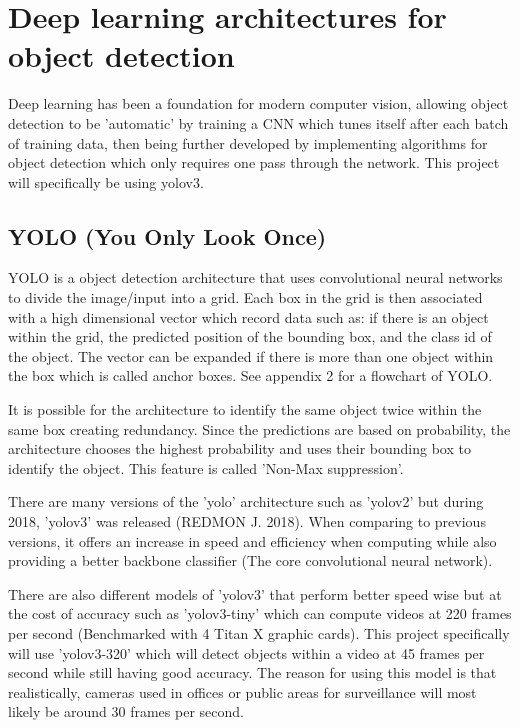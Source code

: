 \documentclass[12pt]{report}
\begin{document}
\section{Deep learning architectures for object detection}

Deep learning has been a foundation for modern computer vision, allowing object detection to be 'automatic' by training a CNN which tunes itself after each batch of training data, then being further developed by implementing algorithms for object detection which only requires one pass through the network. This project will specifically be using yolov3.

\subsection{YOLO (You Only Look Once)}

YOLO is a object detection architecture that uses convolutional neural networks to divide the image/input into a grid. Each box in the grid is then associated with a high dimensional vector which record data such as: if there is an object within the grid, the predicted position of the bounding box, and the class id of the object. The vector can be expanded if there is more than one object within the box which is called anchor boxes. See appendix 2 for a flowchart of YOLO.

\vspace{2mm}

It is possible for the architecture to identify the same object twice within the same box creating redundancy. Since the predictions are based on probability, the architecture chooses the highest probability and uses their bounding box to identify the object. This feature is called 'Non-Max suppression'.

\vspace{2mm}

There are many versions of the 'yolo' architecture such as 'yolov2' but during 2018, 'yolov3' was released (REDMON J. 2018). When comparing to previous versions, it offers an increase in speed and efficiency when computing while also providing a better backbone classifier (The core convolutional neural network). 

\vspace{2mm}
There are also different models of 'yolov3' that perform better speed wise but at the cost of accuracy such as 'yolov3-tiny' which can compute videos at 220 frames per second (Benchmarked with 4 Titan X graphic cards). This project specifically will use 'yolov3-320' which will detect objects within a video at 45 frames per second while still having good accuracy. The reason for using this model is that realistically, cameras used in offices or public areas for surveillance will most likely be around 30 frames per second.
\end{document}
